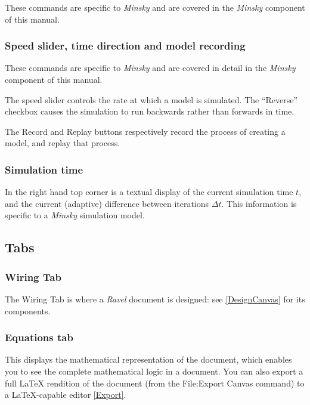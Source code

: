 These commands are specific to \emph{Minsky} and are covered in the
\emph{Minsky} component of this manual.

\subsubsection{Speed slider, time direction and model recording}

These commands are specific to \emph{Minsky} and are covered in detail
in the \emph{Minsky} component of this manual.

The speed slider controls the rate at which a model is simulated.
The ``Reverse'' checkbox causes the simulation to run backwards
rather than forwards in time. 

The Record and Replay buttons respectively record the process of creating
a model, and replay that process. 

\subsubsection{Simulation time}

In the right hand top corner is a textual display of the current simulation
time $t$, and the current (adaptive) difference between iterations
$\Delta t$. This information is specific to a \emph{Minsky} simulation
model.

\subsection{Tabs}

\subsubsection{Wiring Tab}

\label{tabs:wiring}

The Wiring Tab is where a \emph{Ravel} document is designed: see \ref{DesignCanvas}
for its components.

\subsubsection{Equations tab}

\label{tabs:Equations}

This displays the mathematical representation of the document, which
enables you to see the complete mathematical logic in a document.
You can also export a full LaTeX rendition of the document (from the
File:Export Canvas command) to a LaTeX-capable editor \ref{Export}.


